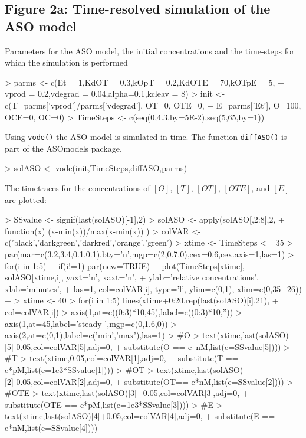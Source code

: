 \documentclass{article}
\begin{document}
\subsection*{Figure 2a: Time-resolved simulation of the ASO model}
Parameters for the ASO model, the initial concentrations and the time-steps for which the simulation is performed
\begin{Schunk}
\begin{Sinput}
> parms <- c(Et = 1,KdOT = 0.3,kOpT = 0.2,KdOTE = 70,kOTpE = 5,  
+            vprod = 0.2,vdegrad = 0.04,alpha=0.1,kcleav = 8)
> init <- c(T=parms['vprod']/parms['vdegrad'], OT=0, OTE=0, 
+           E=parms['Et'], O=100, OCE=0, OC=0)
> TimeSteps <- c(seq(0,4.3,by=5E-2),seq(5,65,by=1))
\end{Sinput}
\end{Schunk}
Using \texttt{vode()} the ASO model is simulated in time. The function \texttt{diffASO()} is part of the ASOmodels package. 
\begin{Schunk}
\begin{Sinput}
> solASO <- vode(init,TimeSteps,diffASO,parms)
\end{Sinput}
\end{Schunk}
The timetraces for the concentrations of $[O]$, $[T]$, $[OT]$, $[OTE]$, and $[E]$ are plotted:
\begin{Schunk}
\begin{Sinput}
> SSvalue <- signif(last(solASO)[-1],2)
> solASO <- apply(solASO[,2:8],2,
+                 function(x) (x-min(x))/max(x-min(x)) )
> colVAR <- c('black','darkgreen','darkred','orange','green')
> xtime <- TimeSteps <= 35
> par(mar=c(3.2,3.4,0.1,0.1),bty='n',mgp=c(2,0.7,0),cex=0.6,cex.axis=1,las=1)
> for(i in 1:5){ 
+   if(i!=1) par(new=TRUE)
+   plot(TimeSteps[xtime], solASO[xtime,i], yaxt='n', xaxt='n',
+        ylab='relative concentrations', xlab='minutes',
+        las=1, col=colVAR[i], type='l', ylim=c(0,1), xlim=c(0,35+26))
+ }
> xtime <- 40
> for(i in 1:5) lines(xtime+0:20,rep(last(solASO)[i],21),
+                     col=colVAR[i])
> axis(1,at=c((0:3)*10,45),label=c((0:3)*10,''))
> axis(1,at=45,label='steady-\nstate',mgp=c(0,1.6,0))
> axis(2,at=c(0,1),label=c('min','max'),las=1)
> #O
> text(xtime,last(solASO)[5]-0.05,col=colVAR[5],adj=0,
+      substitute(O == e~nM,list(e=SSvalue[5])))
> #T
> text(xtime,0.05,col=colVAR[1],adj=0,
+      substitute(T == e*pM,list(e=1e3*SSvalue[1])))
> #OT
> text(xtime,last(solASO)[2]-0.05,col=colVAR[2],adj=0,
+      substitute(OT== e*nM,list(e=SSvalue[2])))
> #OTE
> text(xtime,last(solASO)[3]+0.05,col=colVAR[3],adj=0,
+      substitute(OTE == e*pM,list(e=1e3*SSvalue[3])))
> #E
> text(xtime,last(solASO)[4]+0.05,col=colVAR[4],adj=0,
+      substitute(E == e*nM,list(e=SSvalue[4])))
\end{Sinput}
\end{Schunk}
\end{document}
